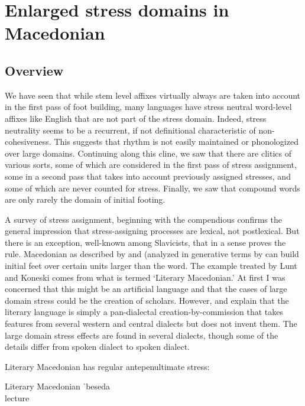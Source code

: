 \documentclass[output=paper,
modfonts
]{LSP/langsci}
\begin{document}
\section[Enlarged stress domains in Macedonian]{Enlarged stress domains in Macedonian}
\subsection[Overview]{Overview}


We have seen that while stem level affixes virtually always are taken into account in the first pass of foot building, many languages have stress neutral word-level affixes like English   that are not part of the stress domain. Indeed, stress neutrality seems to be a recurrent, if not definitional characteristic of non-cohesiveness. This suggests that rhythm is not easily maintained or phonologized over large domains. Continuing along this cline, we saw that there are clitics of various sorts, some of which are considered in the first pass of stress assignment, some in a second pass that takes into account previously assigned stresses, and some of which are never counted for stress. Finally, we saw that compound words are only rarely the domain of initial footing. 

A survey of stress assignment, beginning with the compendious \citet{hayes1995} confirms the general impression that stress-assigning processes are lexical, not postlexical. But there is an exception, well-known among Slavicists, that in a sense proves the rule. Macedonian as described by \citet{lunt1952} and \citet{koneski1976} (analyzed in generative terms by \citealt{franks1987,franks1989} can build initial feet over certain units larger than the word. The example treated by Lunt and Koneski comes from what is termed ‘Literary Macedonian.’ At first I was concerned that this might be an artificial language and that the cases of large domain stress could be the creation of scholars. However, \citet[5--6]{lunt1952} and \citet{franks1987} explain that the literary language is simply a pan-dialectal creation-by-commission that takes features from several western and central dialects but does not invent them. The large domain stress effects are found in several dialects, though some of the details differ from spoken dialect to spoken dialect. 

Literary Macedonian has regular antepenultimate stress:

\ea Literary Macedonian \citep{lunt1952,franks1987,franks1989}
	\ea \gll  ˈbeseda\\
	lecture\\
	
\end{document}

